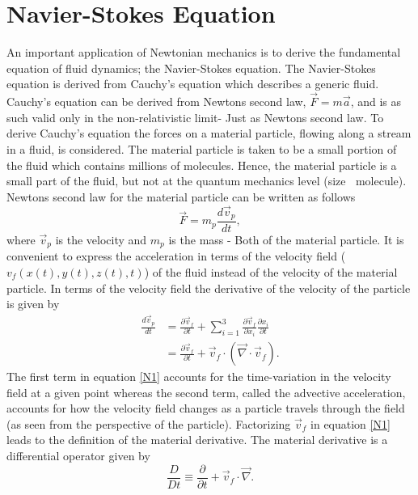 \section{Navier-Stokes Equation}
An important application of Newtonian mechanics is to derive the fundamental equation of fluid dynamics; the Navier-Stokes equation. The Navier-Stokes equation is derived from Cauchy's equation which describes a generic fluid. Cauchy's equation can be derived from Newtons second law, $\vec{F}=m\vec{a}$, and is as such valid only in the non-relativistic limit- Just as Newtons second law. To derive Cauchy's equation the forces on a material particle, flowing along a stream in a fluid, is considered. The material particle is taken to be a small portion of the fluid which contains millions of molecules. Hence, the material particle is a small part of the fluid, but not at the quantum mechanics level (size $~$ molecule). Newtons second law for the material particle can be written as follows
\begin{equation}
	\vec{F}=m_p\frac{d\vec{v}_{p}}{dt},
\end{equation}   
where $\vec{v}_p$ is the velocity and $m_p$ is the mass - Both of the material particle. It is convenient to express the acceleration in terms of the velocity field ($v_f(x(t),y(t),z(t),t)$) of the fluid instead of the velocity of the material particle. In terms of the velocity field the derivative of the velocity of the particle is given by
\begin{equation}
	\begin{split}
		\frac{d\vec{v}_{p}}{dt}&=\frac{\partial \vec{v}_f}{\partial t}+\sum_{i=1}^{3}\frac{\partial \vec{v}_f}{\partial x_i}\frac{\partial x_i}{\partial t}\\
		&=\frac{\partial \vec{v}_f}{\partial t}+\vec{v}_f\cdot (\vec{\nabla}\cdot\vec{v}_f).
	\end{split}
	\label{N1}
\end{equation} 
The first term in equation \eqref{N1} accounts for the time-variation in the velocity field at a given point whereas the second term, called the advective acceleration, accounts for how the velocity field changes as a particle travels through the field (as seen from the perspective of the particle). Factorizing $\vec{v}_f$ in equation \eqref{N1} leads to the definition of the material derivative. The material derivative is a differential operator given by
\begin{equation}
	\frac{D}{Dt}\equiv \frac{\partial }{\partial t}+\vec{v}_f\cdot \vec{\nabla}.
\end{equation}  
